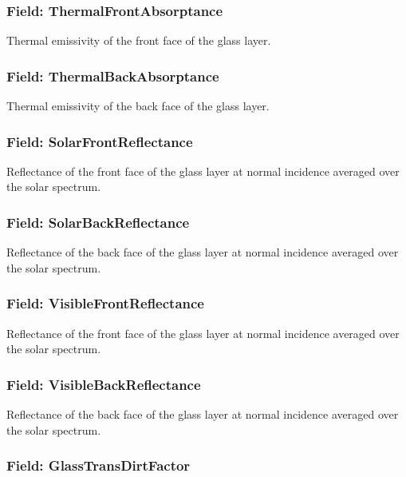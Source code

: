 \subsubsection{Field: ThermalFrontAbsorptance}\label{field-thermalfrontabsorptance}

Thermal emissivity of the front face of the glass layer.

\subsubsection{Field: ThermalBackAbsorptance}\label{field-thermalbackabsorptance}

Thermal emissivity of the back face of the glass layer.

\subsubsection{Field: SolarFrontReflectance}\label{field-solarfrontreflectance}

Reflectance of the front face of the glass layer at normal incidence averaged over the solar spectrum.

\subsubsection{Field: SolarBackReflectance}\label{field-solarbackreflectance}

Reflectance of the back face of the glass layer at normal incidence averaged over the solar spectrum.

\subsubsection{Field: VisibleFrontReflectance}\label{field-visiblefrontreflectance}

Reflectance of the front face of the glass layer at normal incidence averaged over the solar spectrum.

\subsubsection{Field: VisibleBackReflectance}\label{field-visiblebackreflectance}

Reflectance of the back face of the glass layer at normal incidence averaged over the solar spectrum.

\subsubsection{Field: GlassTransDirtFactor}\label{field-glasstransdirtfactor}

